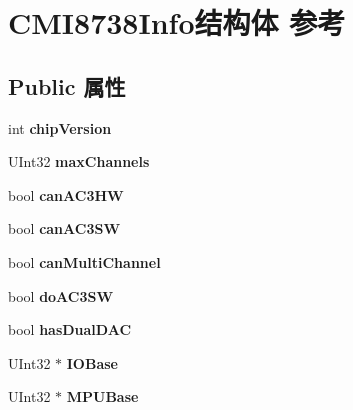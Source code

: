 \hypertarget{struct_c_m_i8738_info}{}\section{C\+M\+I8738\+Info结构体 参考}
\label{struct_c_m_i8738_info}
\subsection*{Public 属性}
\begin{DoxyCompactItemize}
\item 
\mbox{\label{struct_c_m_i8738_info_a06195060d19cb51fc4e9f7a931bd2f90}} 
int {\bfseries chip\+Version}
\item 
\mbox{\label{struct_c_m_i8738_info_a561ae8135ce97830ff08ff24fe6ea883}} 
U\+Int32 {\bfseries max\+Channels}
\item 
\mbox{\label{struct_c_m_i8738_info_aa9f9fa8a3bbe41b1624d01bb3c740a73}} 
bool {\bfseries can\+A\+C3\+HW}
\item 
\mbox{\label{struct_c_m_i8738_info_a630e2e515641d05de7d25e9ea49f1708}} 
bool {\bfseries can\+A\+C3\+SW}
\item 
\mbox{\label{struct_c_m_i8738_info_a6b5a2d3236055d86aff0627bc49573b7}} 
bool {\bfseries can\+Multi\+Channel}
\item 
\mbox{\label{struct_c_m_i8738_info_af33a999637ab59359d68433157952b83}} 
bool {\bfseries do\+A\+C3\+SW}
\item 
\mbox{\label{struct_c_m_i8738_info_a2b926da7f66177b0df3109a4603c3829}} 
bool {\bfseries has\+Dual\+D\+AC}
\item 
\mbox{\label{struct_c_m_i8738_info_a1e238e3d5e0cbdbd29cad53c5c336120}} 
U\+Int32 $\ast$ {\bfseries I\+O\+Base}
\item 
\mbox{\label{struct_c_m_i8738_info_a000ed441d2118b1eb9de06fd572d330f}} 
U\+Int32 $\ast$ {\bfseries M\+P\+U\+Base}
\item 

\end{DoxyCompactItemize}
